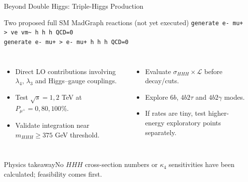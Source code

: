 \documentclass[aspectratio=1610,english]{beamer}
\newcommand{\src}[1]{\vfill{\par\color{black!65}\fontsize{6.4}{7.4}\selectfont\emph{Source:} #1\par}}
\newcommand{\key}[1]{\begin{alertblock}{Physics takeaway}\scriptsize #1\end{alertblock}}
\begin{document}
\begin{frame}[t]{Beyond Double Higgs: Triple-Higgs Production}
\small

\begin{block}{Two proposed full SM MadGraph reactions (not yet executed)}
\texttt{generate e- mu+ > ve vm\textasciitilde{} h h h QCD=0}\\[.45em]
\texttt{generate e- mu+ > e- mu+ h h h QCD=0}
\end{block}
\begin{columns}%
\begin{itemize}\item Direct LO contributions involving $\lambda_4$, $\lambda_3$ and Higgs--gauge couplings.
\item Test $\sqrt{s}=1,2$ TeV at $P_{\mu^+}=0,80,100\%$.
\item Validate integration near $m_{HHH}\geq375$ GeV threshold.
\end{itemize}
\begin{itemize}\item Evaluate $\sigma_{HHH}\times\mathcal L$ before decay/cuts.
\item Explore $6b$, $4b2\tau$ and $4b2\gamma$ modes.
\item If rates are tiny, test higher-energy exploratory points separately.
\end{itemize}
\end{columns}
\key{No $HHH$ cross-section numbers or $\kappa_4$ sensitivities have been calculated; feasibility comes first.}

\end{frame}
\end{document}
